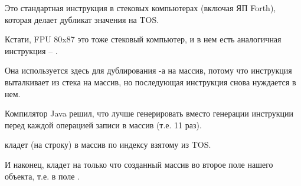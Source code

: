 Это стандартная инструкция в стековых компьютерах (включая ЯП Forth),
которая делает дубликат значения на \ac{TOS}.

Кстати, FPU 80x87 это тоже стековый компьютер, и в нем есть аналогичная инструкция -- .


Она используется здесь для дублирования -а на массив, 
потому что инструкция  выталкивает из стека  на массив, 
но последующая инструкция  снова нуждается в нем.

Компилятор Java решил, что лучше генерировать  вместо генерации инструкции
 перед каждой операцией записи в массив (т.е. 11 раз).


 кладет  (на строку) в массив по индексу взятому из \ac{TOS}.


И наконец,  кладет  на только что созданный массив во второе поле
нашего объекта, т.е. в поле .
